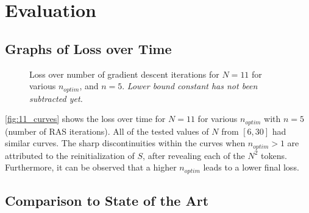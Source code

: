 \section{Evaluation}%
\label{sec:evaluation}
\subsection{Graphs of Loss over Time}%
\label{sub:graphs_of_loss_over_time}
\begin{figure}[htpb]
    \centering
    
    \caption{Loss over number of gradient descent iterations for $N=11$ for various $n_{optim}$, and $n=5$. \emph{Lower bound constant has not been subtracted yet.}}
    \label{fig:11_curves}
\end{figure}

\autoref{fig:11_curves} shows the loss over time for $N=11$ for various $n_{optim}$ with $n=5$ (number of RAS iterations). All of the tested values of $N$ from $[6,30]$ had similar curves. The sharp discontinuities within the curves when $n_{optim}>1$ are attributed to the reinitialization of $S$, after revealing each of the $N^2$ tokens. Furthermore, it can be observed that a higher $n_{optim}$ leads to a lower final loss.

\subsection{Comparison to State of the Art}%
\label{sub:comparison_to_state_of_the_art}

